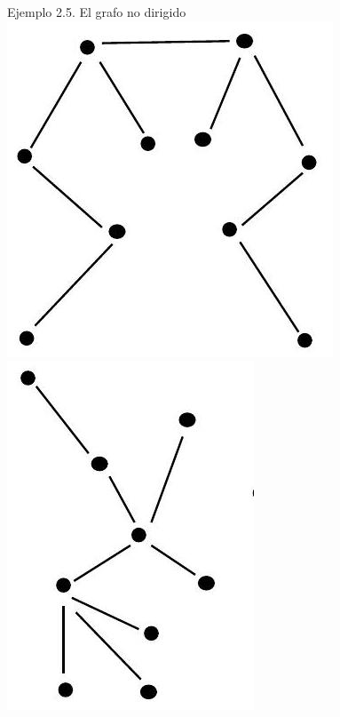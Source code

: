 \documentclass[10pt]{article}
\begin{document}
Ejemplo 2.5. El grafo no dirigido\\
\includegraphics[max width=\textwidth, center]{2025_09_05_93c7c1835f249f70c0eeg-04(2)}\\
\includegraphics[max width=\textwidth, center]{2025_09_05_93c7c1835f249f70c0eeg-04}\\
\end{document}
